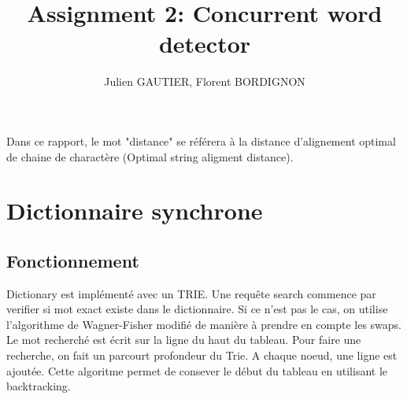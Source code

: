 \documentclass{article}
\title{Assignment 2: Concurrent word detector}
\author{Julien GAUTIER, Florent BORDIGNON}
\begin{document}
\maketitle
Dans ce rapport, le mot "distance" se référera à la distance
d'alignement optimal de chaine de charactère (Optimal string aligment
distance).

\section{Dictionnaire synchrone}
\subsection{Fonctionnement}
Dictionary est implémenté avec un TRIE.
Une requête search commence par verifier si mot exact existe dans le dictionnaire. Si ce n'est pas le cas, on utilise l'algorithme de Wagner-Fisher modifié de manière à prendre en compte les swaps.
Le mot recherché est écrit sur la ligne du haut du tableau.
Pour faire une recherche, on fait un parcourt profondeur du Trie. A chaque
noeud, une ligne est ajoutée. Cette algoritme permet de consever le début du
tableau en utilisant le backtracking.\\


\end{document}

